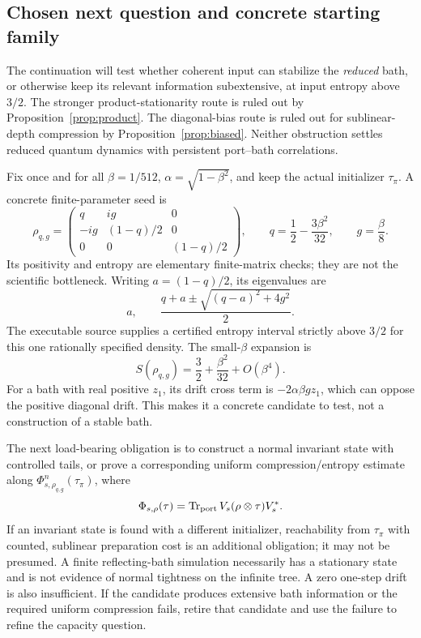\subsection{Chosen next question and concrete starting family}

The continuation will test whether coherent input can stabilize the \emph{reduced} bath, or otherwise keep its relevant information subextensive, at input entropy above $3/2$. The stronger product-stationarity route is ruled out by Proposition~\ref{prop:product}. The diagonal-bias route is ruled out for sublinear-depth compression by Proposition~\ref{prop:biased}. Neither obstruction settles reduced quantum dynamics with persistent port--bath correlations.

Fix once and for all $\beta=1/512$, $\alpha=\sqrt{1-\beta^2}$, and keep the actual initializer $\tau_\pi$. A concrete finite-parameter seed is
\begin{equation}
 \rho_{q,g}=\begin{pmatrix}q&ig&0\\-ig&(1-q)/2&0\\0&0&(1-q)/2\end{pmatrix},
 \qquad q=\frac12-\frac{3\beta^2}{32},\qquad g=\frac\beta8.
 \label{eq:seed}
\end{equation}
Its positivity and entropy are elementary finite-matrix checks; they are not the scientific bottleneck. Writing $a=(1-q)/2$, its eigenvalues are
\[
 a,\qquad \frac{q+a\pm\sqrt{(q-a)^2+4g^2}}2.
\]
The executable source supplies a certified entropy interval strictly above $3/2$ for this one rationally specified density. The small-$\beta$ expansion is
\[
 S(\rho_{q,g})=\frac32+\frac{\beta^2}{32}+O(\beta^4).
\]
For a bath with real positive $z_1$, its drift cross term is $-2\alpha\beta g z_1$, which can oppose the positive diagonal drift. This makes it a concrete candidate to test, not a construction of a stable bath.

The next load-bearing obligation is to construct a normal invariant state with controlled tails, or prove a corresponding uniform compression/entropy estimate along $\Phi_{s,\rho_{q,g}}^n(\tau_\pi)$, where
\[
 \Phi_{s,\rho}(\tau)=\operatorname{Tr}_{\rm port}V_s(\rho\otimes\tau)V_s^*.
\]
If an invariant state is found with a different initializer, reachability from $\tau_\pi$ with counted, sublinear preparation cost is an additional obligation; it may not be presumed. A finite reflecting-bath simulation necessarily has a stationary state and is not evidence of normal tightness on the infinite tree. A zero one-step drift is also insufficient. If the candidate produces extensive bath information or the required uniform compression fails, retire that candidate and use the failure to refine the capacity question.

